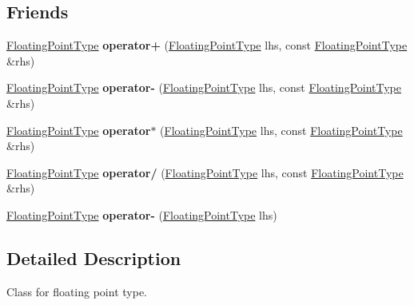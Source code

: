 \subsection*{Friends}
\begin{DoxyCompactItemize}
\item 
\hypertarget{classfap_1_1FloatingPointType_abcfae07b411e30db64605af8f2e31378}{}\label{classfap_1_1FloatingPointType_abcfae07b411e30db64605af8f2e31378} 
\hyperlink{classfap_1_1FloatingPointType}{Floating\+Point\+Type} {\bfseries operator+} (\hyperlink{classfap_1_1FloatingPointType}{Floating\+Point\+Type} lhs, const \hyperlink{classfap_1_1FloatingPointType}{Floating\+Point\+Type} \&rhs)
\item 
\hypertarget{classfap_1_1FloatingPointType_a5c30dfc6a4c2547c7cd525eaae60c396}{}\label{classfap_1_1FloatingPointType_a5c30dfc6a4c2547c7cd525eaae60c396} 
\hyperlink{classfap_1_1FloatingPointType}{Floating\+Point\+Type} {\bfseries operator-\/} (\hyperlink{classfap_1_1FloatingPointType}{Floating\+Point\+Type} lhs, const \hyperlink{classfap_1_1FloatingPointType}{Floating\+Point\+Type} \&rhs)
\item 
\hypertarget{classfap_1_1FloatingPointType_a24fd8df3e11e0f61146f5f87dcaae09b}{}\label{classfap_1_1FloatingPointType_a24fd8df3e11e0f61146f5f87dcaae09b} 
\hyperlink{classfap_1_1FloatingPointType}{Floating\+Point\+Type} {\bfseries operator$\ast$} (\hyperlink{classfap_1_1FloatingPointType}{Floating\+Point\+Type} lhs, const \hyperlink{classfap_1_1FloatingPointType}{Floating\+Point\+Type} \&rhs)
\item 
\hypertarget{classfap_1_1FloatingPointType_a51cb9aaf14915f56602fae7eca0122c8}{}\label{classfap_1_1FloatingPointType_a51cb9aaf14915f56602fae7eca0122c8} 
\hyperlink{classfap_1_1FloatingPointType}{Floating\+Point\+Type} {\bfseries operator/} (\hyperlink{classfap_1_1FloatingPointType}{Floating\+Point\+Type} lhs, const \hyperlink{classfap_1_1FloatingPointType}{Floating\+Point\+Type} \&rhs)
\item 
\hypertarget{classfap_1_1FloatingPointType_a74c4dee1e18ed7ad20f6c0a4b96732a6}{}\label{classfap_1_1FloatingPointType_a74c4dee1e18ed7ad20f6c0a4b96732a6} 
\hyperlink{classfap_1_1FloatingPointType}{Floating\+Point\+Type} {\bfseries operator-\/} (\hyperlink{classfap_1_1FloatingPointType}{Floating\+Point\+Type} lhs)
\end{DoxyCompactItemize}


\subsection{Detailed Description}
Class for floating point type. 

